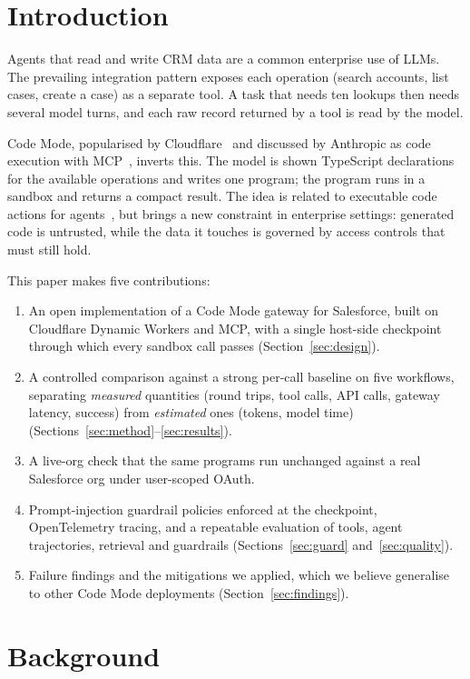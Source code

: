 \documentclass[11pt]{article}
\begin{document}
\section{Introduction}
Agents that read and write CRM data are a common enterprise use of LLMs. The prevailing integration pattern exposes each operation (search accounts, list cases, create a case) as a separate tool. A task that needs ten lookups then needs several model turns, and each raw record returned by a tool is read by the model.

Code Mode, popularised by Cloudflare~\cite{cfcodemode} and discussed by Anthropic as code execution with MCP~\cite{anthropiccodeexec}, inverts this. The model is shown TypeScript declarations for the available operations and writes one program; the program runs in a sandbox and returns a compact result. The idea is related to executable code actions for agents~\cite{codeact}, but brings a new constraint in enterprise settings: generated code is untrusted, while the data it touches is governed by access controls that must still hold.

This paper makes five contributions:
\begin{enumerate}
\item An open implementation of a Code Mode gateway for Salesforce, built on Cloudflare Dynamic Workers and MCP, with a single host-side checkpoint through which every sandbox call passes (Section~\ref{sec:design}).
\item A controlled comparison against a strong per-call baseline on five workflows, separating \emph{measured} quantities (round trips, tool calls, API calls, gateway latency, success) from \emph{estimated} ones (tokens, model time) (Sections~\ref{sec:method}--\ref{sec:results}).
\item A live-org check that the same programs run unchanged against a real Salesforce org under user-scoped OAuth.
\item Prompt-injection guardrail policies enforced at the checkpoint, OpenTelemetry tracing, and a repeatable evaluation of tools, agent trajectories, retrieval and guardrails (Sections~\ref{sec:guard} and~\ref{sec:quality}).
\item Failure findings and the mitigations we applied, which we believe generalise to other Code Mode deployments (Section~\ref{sec:findings}).
\end{enumerate}

\section{Background}
\end{document}
